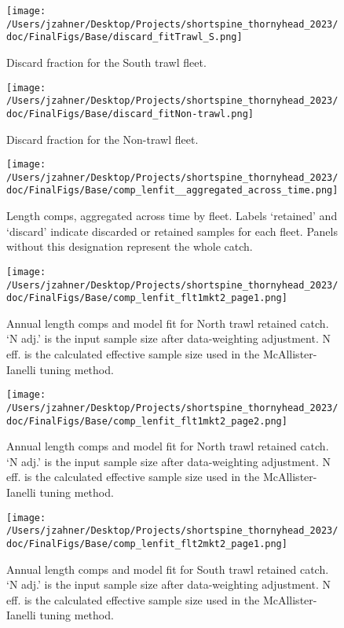 \documentclass[11pt,
  english,
  letterpaper,
]{article}
\begin{document}
\begin{figure}
\centering
\texttt{[image: /Users/jzahner/Desktop/Projects/shortspine\_thornyhead\_2023/doc/FinalFigs/Base/discard\_fitTrawl\_S.png]}
\caption{Discard fraction for the South trawl fleet.\label{fig:southtrl_disc}}
\end{figure}

\begin{figure}
\centering
\texttt{[image: /Users/jzahner/Desktop/Projects/shortspine\_thornyhead\_2023/doc/FinalFigs/Base/discard\_fitNon-trawl.png]}
\caption{Discard fraction for the Non-trawl fleet.\label{fig:nontrl_disc}}
\end{figure}

\begin{figure}
\centering
\texttt{[image: /Users/jzahner/Desktop/Projects/shortspine\_thornyhead\_2023/doc/FinalFigs/Base/comp\_lenfit\_\_aggregated\_across\_time.png]}
\caption{Length comps, aggregated across time by fleet. Labels `retained' and `discard' indicate discarded or retained samples for each fleet. Panels without this designation represent the whole catch.\label{fig:lencomps_all}}
\end{figure}

\begin{figure}
\centering
\texttt{[image: /Users/jzahner/Desktop/Projects/shortspine\_thornyhead\_2023/doc/FinalFigs/Base/comp\_lenfit\_flt1mkt2\_page1.png]}
\caption{Annual length comps and model fit for North trawl retained catch. `N adj.' is the input sample size after data-weighting adjustment. N eff. is the calculated effective sample size used in the McAllister-Ianelli tuning method.\label{fig:ntrawl_comps_1}}
\end{figure}

\begin{figure}
\centering
\texttt{[image: /Users/jzahner/Desktop/Projects/shortspine\_thornyhead\_2023/doc/FinalFigs/Base/comp\_lenfit\_flt1mkt2\_page2.png]}
\caption{Annual length comps and model fit for North trawl retained catch. `N adj.' is the input sample size after data-weighting adjustment. N eff. is the calculated effective sample size used in the McAllister-Ianelli tuning method.\label{fig:ntrawl_comps_2}}
\end{figure}

\begin{figure}
\centering
\texttt{[image: /Users/jzahner/Desktop/Projects/shortspine\_thornyhead\_2023/doc/FinalFigs/Base/comp\_lenfit\_flt2mkt2\_page1.png]}
\caption{Annual length comps and model fit for South trawl retained catch. `N adj.' is the input sample size after data-weighting adjustment. N eff. is the calculated effective sample size used in the McAllister-Ianelli tuning method.\label{fig:strawl_comps_1}}
\end{figure}
\end{document}
